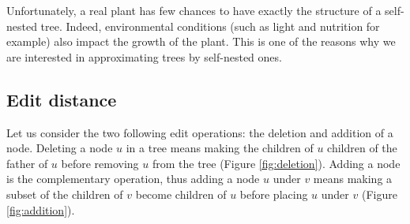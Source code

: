 Unfortunately, a real plant has few chances to have exactly the
structure of a self-nested tree. Indeed, environmental conditions
(such as light and nutrition for example) also impact the growth of
the plant. This is one of the reasons why we are interested in
approximating trees by self-nested ones.

\subsection{Edit distance}
Let us consider the two following edit operations: the deletion and
addition of a node. Deleting a node $u$ in a tree means making the
children of $u$ children of the father of $u$ before removing $u$ from
the tree (Figure \ref{fig:deletion}). Adding a node is the
complementary operation, thus adding a node $u$ under $v$ means making
a subset of the children of $v$ become children of $u$ before placing
$u$ under $v$ (Figure \ref{fig:addition}).

